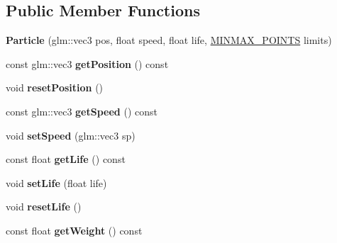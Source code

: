 \subsection*{Public Member Functions}
\begin{DoxyCompactItemize}
\item 
{\bfseries Particle} (glm\+::vec3 pos, float speed, float life, \hyperlink{struct_m_i_n_m_a_x___p_o_i_n_t_s}{M\+I\+N\+M\+A\+X\+\_\+\+P\+O\+I\+N\+TS} limits)\hypertarget{class_particle_a9a2736511bce4ffbb36b664a97147f81}{}\label{class_particle_a9a2736511bce4ffbb36b664a97147f81}

\item 
const glm\+::vec3 {\bfseries get\+Position} () const \hypertarget{class_particle_a266d389d1bc213520c563bb2ab8b4ea2}{}\label{class_particle_a266d389d1bc213520c563bb2ab8b4ea2}

\item 
void {\bfseries reset\+Position} ()\hypertarget{class_particle_aa8e020fb8b433923044a287c74eec0ec}{}\label{class_particle_aa8e020fb8b433923044a287c74eec0ec}

\item 
const glm\+::vec3 {\bfseries get\+Speed} () const \hypertarget{class_particle_a44d05de509c90f2fe48dadfa071ba361}{}\label{class_particle_a44d05de509c90f2fe48dadfa071ba361}

\item 
void {\bfseries set\+Speed} (glm\+::vec3 sp)\hypertarget{class_particle_ad38624600c51081eedb768b5785025f9}{}\label{class_particle_ad38624600c51081eedb768b5785025f9}

\item 
const float {\bfseries get\+Life} () const \hypertarget{class_particle_a4832a6739180d12ece51a65d197dfaa9}{}\label{class_particle_a4832a6739180d12ece51a65d197dfaa9}

\item 
void {\bfseries set\+Life} (float life)\hypertarget{class_particle_ae048a4fbc1009f563992cb09bb349d51}{}\label{class_particle_ae048a4fbc1009f563992cb09bb349d51}

\item 
void {\bfseries reset\+Life} ()\hypertarget{class_particle_a39520f30d49f6d8d6958981bf4442622}{}\label{class_particle_a39520f30d49f6d8d6958981bf4442622}

\item 
const float {\bfseries get\+Weight} () const \hypertarget{class_particle_a36adaa6affd83d4cbad7ef6be4af5cbf}{}\label{class_particle_a36adaa6affd83d4cbad7ef6be4af5cbf}


\end{DoxyCompactItemize}
